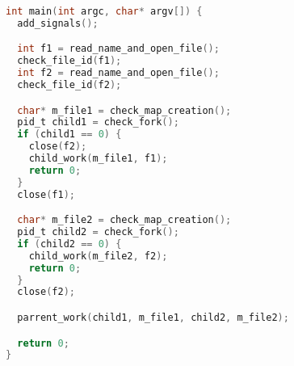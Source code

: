 \begin{lstlisting}[language=C]
int main(int argc, char* argv[]) {
  add_signals();

  int f1 = read_name_and_open_file();
  check_file_id(f1);
  int f2 = read_name_and_open_file();
  check_file_id(f2);

  char* m_file1 = check_map_creation();
  pid_t child1 = check_fork();
  if (child1 == 0) {
    close(f2);
    child_work(m_file1, f1);
    return 0;
  }
  close(f1);

  char* m_file2 = check_map_creation();
  pid_t child2 = check_fork();
  if (child2 == 0) {
    child_work(m_file2, f2);
    return 0;
  }
  close(f2);

  parrent_work(child1, m_file1, child2, m_file2);

  return 0;
}

\end{lstlisting}

\pagebreak